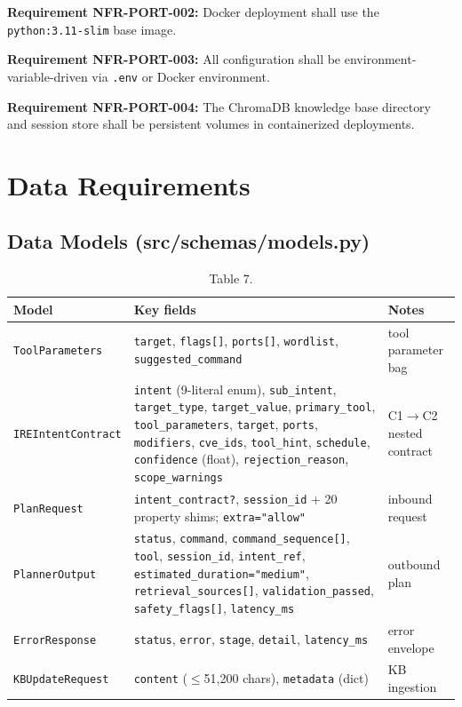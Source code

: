 \documentclass[10pt,journal,onecolumn]{IEEEtran}
\newcommand{\reqid}[1]{\textbf{#1}}
\begin{document}
\reqid{Requirement NFR-PORT-002:} Docker deployment shall use the \texttt{python:3.11-slim} base image.

\reqid{Requirement NFR-PORT-003:} All configuration shall be environment-variable-driven via \texttt{.env} or Docker environment.

\reqid{Requirement NFR-PORT-004:} The ChromaDB knowledge base directory and session store shall be persistent volumes in containerized deployments.

\section{Data Requirements}

\subsection{Data Models (src/schemas/models.py)}

\begin{table}[h]
\caption{Table 7.}
\label{tab:t7}
\begin{tabularx}{\columnwidth}{l >{\raggedright\arraybackslash}X >{\raggedright\arraybackslash}X}
\toprule
\textbf{Model} & \textbf{Key fields} & \textbf{Notes}\\
\midrule
\texttt{ToolParameters} & \texttt{target}, \texttt{flags[]}, \texttt{ports[]}, \texttt{wordlist}, \texttt{suggested\_command} & tool parameter bag\\
\texttt{IREIntentContract} & \texttt{intent} (9-literal enum), \texttt{sub\_intent}, \texttt{target\_type}, \texttt{target\_value}, \texttt{primary\_tool}, \texttt{tool\_parameters}, \texttt{target}, \texttt{ports}, \texttt{modifiers}, \texttt{cve\_ids}, \texttt{tool\_hint}, \texttt{schedule}, \texttt{confidence} (float), \texttt{rejection\_reason}, \texttt{scope\_warnings} & C1$\rightarrow$C2 nested contract\\
\texttt{PlanRequest} & \texttt{intent\_contract?}, \texttt{session\_id} + 20 property shims; \texttt{extra="allow"} & inbound request\\
\texttt{PlannerOutput} & \texttt{status}, \texttt{command}, \texttt{command\_sequence[]}, \texttt{tool}, \texttt{session\_id}, \texttt{intent\_ref}, \texttt{estimated\_\allowbreak duration="medium"}, \texttt{retrieval\_sources[]}, \texttt{validation\_passed}, \texttt{safety\_flags[]}, \texttt{latency\_ms} & outbound plan\\
\texttt{ErrorResponse} & \texttt{status}, \texttt{error}, \texttt{stage}, \texttt{detail}, \texttt{latency\_ms} & error envelope\\
\texttt{KBUpdateRequest} & \texttt{content} ($\leq$51,200 chars), \texttt{metadata} (dict) & KB ingestion\\
\bottomrule
\end{tabularx}
\end{table}
\end{document}

